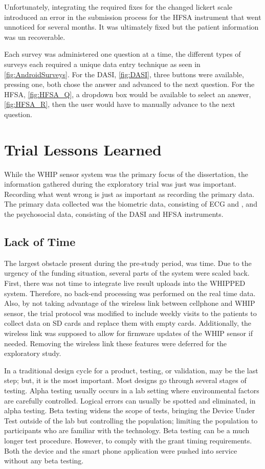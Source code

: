 Unfortunately, integrating the required fixes for the changed lickert scale introduced an error in the submission process for the HFSA instrument that went unnoticed for several months. It was ultimately fixed but the patient information was un recoverable.

Each survey was administered one question at a time, the different types of surveys each required a unique data entry technique as seen in \cref{fig:AndroidSurveys}. For the DASI, \cref{fig:DASI}, three buttons were available, pressing one, both chose the answer and advanced to the next question. For the HFSA, \cref{fig:HFSA_Q}, a dropdown box would be available to select an answer, \cref{fig:HFSA_R}, then the user would have to manually advance to the next question. 



\section{Trial Lessons Learned}

While the WHIP sensor system was the primary focus of the dissertation, the information gathered during the exploratory trial was just was important. Recording what went wrong is just as important as recording the primary data. The primary data collected was the biometric data, consisting of ECG and , and the psychosocial data, consisting of the DASI and HFSA instruments. 

\subsection{Lack of Time}
The largest obstacle present during the pre-study period, was time. Due to the urgency of the funding situation, several parts of the system were scaled back.  First, there was not time to integrate live result uploads into the WHIPPED system. Therefore, no back-end processing was performed on the real time data. Also, by not taking advantage of the wireless link between cellphone and WHIP sensor, the trial protocol was modified to include weekly visits to the patients to collect data on SD cards and replace them with empty cards. Additionally, the wireless link was supposed to allow for firmware updates of the WHIP sensor if needed. Removing the wireless link these features were deferred for the exploratory study.

In a traditional design cycle for a product, testing, or validation, may be the last step; but, it is the most important. Most designs go through several stages of testing. Alpha testing usually occurs in a lab setting where environmental factors are carefully controlled. Logical errors can usually be spotted and eliminated, in alpha testing. Beta testing widens the scope of tests, bringing the Device Under Test outside of the lab but controlling the population; limiting the population to participants who are familiar with the technology. Beta testing can be a much longer test procedure. However, to comply with the grant timing requirements. Both the device and the smart phone application were pushed into service without any beta testing. 

